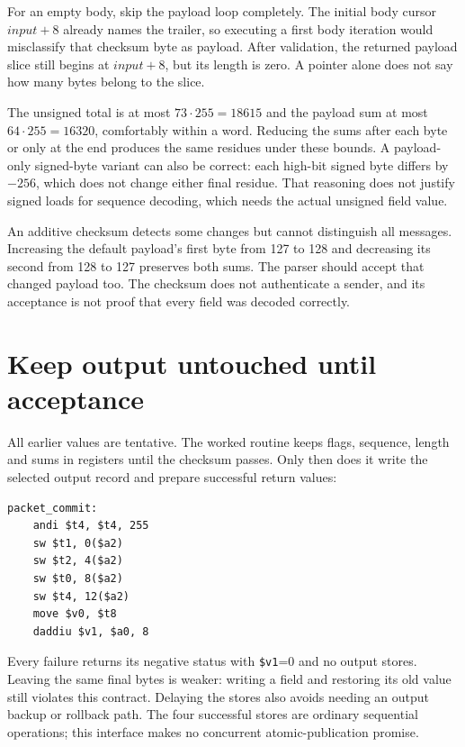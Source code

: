 For an empty body, skip the payload loop completely. The initial body cursor
$input+8$ already names the trailer, so executing a first body iteration would
misclassify that checksum byte as payload. After validation, the returned payload
slice still begins at $input+8$, but its length is zero. A pointer alone does not
say how many bytes belong to the slice.

The unsigned total is at most $73\cdot255=18615$ and the payload sum at most
$64\cdot255=16320$, comfortably within a word. Reducing the sums after each byte
or only at the end produces the same residues under these bounds. A payload-only
signed-byte variant can also be correct: each high-bit signed byte differs by
$-256$, which does not change either final residue. That reasoning does not justify
signed loads for sequence decoding, which needs the actual unsigned field value.

An additive checksum detects some changes but cannot distinguish all messages.
Increasing the default payload's first byte from 127 to 128 and decreasing its
second from 128 to 127 preserves both sums. The parser should accept that changed
payload too. The checksum does not authenticate a sender, and its acceptance is
not proof that every field was decoded correctly.

\section{Keep output untouched until acceptance}

All earlier values are tentative. The worked routine keeps flags, sequence,
length and sums in registers until the checksum passes. Only then does it write
the selected output record and prepare successful return values:

\noindent\begin{minipage}{\linewidth}
  \begin{verbatim}
packet_commit:
    andi $t4, $t4, 255
    sw $t1, 0($a2)
    sw $t2, 4($a2)
    sw $t0, 8($a2)
    sw $t4, 12($a2)
    move $v0, $t8
    daddiu $v1, $a0, 8
\end{verbatim}
\end{minipage}

Every failure returns its negative status with \texttt{\$v1}=0 and no output
stores. Leaving the same final bytes is weaker: writing a field and restoring
its old value still violates this contract. Delaying the stores also avoids
needing an output backup or rollback path. The four successful stores are ordinary
sequential operations; this interface makes no concurrent atomic-publication promise.

